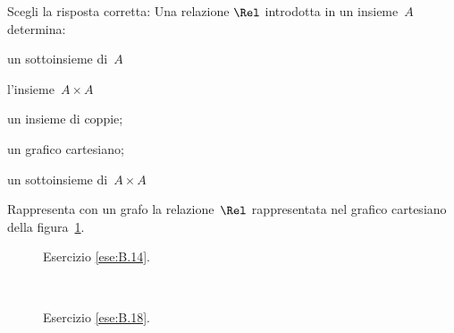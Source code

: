 \begin{multicols}{2}
\begin{esercizio}
\label{ese:B.17}
Scegli la risposta corretta:
Una relazione $\Rel$ introdotta in un insieme~$A$ determina:
\begin{enumeratea}
 \item un sottoinsieme di~$A$
 \item l'insieme~$A \times A$
 \item un insieme di coppie;
 \item un grafico cartesiano;
 \item un sottoinsieme di~$A \times A$
 \end{enumeratea}
\end{esercizio}

\begin{esercizio}
\label{ese:B.18}
Rappresenta con un grafo la relazione~$\Rel$ rappresentata nel grafico 
cartesiano della figura~\ref{fig:B.16}.
\end{esercizio}
\end{multicols}

\begin{inaccessibleblock}
 \begin{figure}[t]
\begin{minipage}[b]{.69\textwidth}
 \centering
 
 \caption{Esercizio \ref{ese:B.14}.}\label{fig:B.15}
\end{minipage}\
\begin{minipage}[b]{.3\textwidth}
 \centering
 
 \caption{Esercizio \ref{ese:B.18}.}\label{fig:B.16}
\end{minipage}
\end{figure}
\end{inaccessibleblock}



